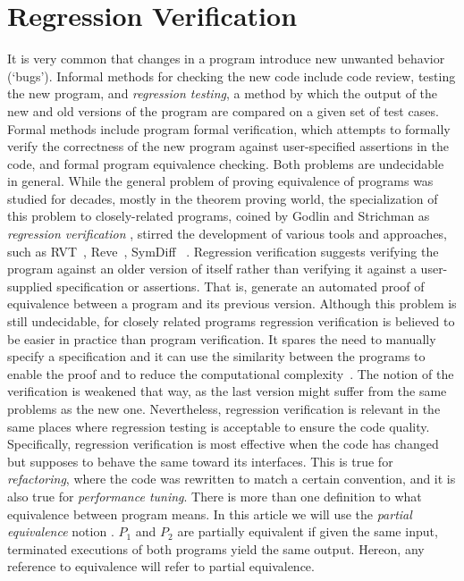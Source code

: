 
\section{Regression Verification}
It is very common that changes in a program introduce new unwanted behavior (`bugs'). Informal methods for checking the new code include code review, testing the new program, and \emph{regression testing}, a method by which the output of the new and old versions of the program are compared on a given set of test cases. Formal methods include program formal verification, which attempts to formally verify the correctness of the new program against user-specified assertions in the code, and formal program equivalence checking. Both problems are undecidable in general. While the general problem of proving equivalence of programs was studied for decades, mostly in the theorem proving world, the specialization of this problem to closely-related programs, coined by  
Godlin and Strichman as \emph{regression verification} \cite{DBLP:conf/dac/GodlinS09}, stirred the development of various tools and approaches, such as RVT~\cite{DBLP:conf/dac/GodlinS09}, Reve~\cite{DBLP:conf/kbse/FelsingGKRU14}, SymDiff~\cite{DBLP:conf/cav/LahiriHKR12} . Regression verification suggests verifying the program against an older version of itself rather than verifying it against a user-supplied specification or assertions. That is, generate an automated proof of equivalence between a program and its previous version. Although this problem is still undecidable, for closely related programs regression verification is believed to be easier in practice than program verification. It spares the need to manually specify a specification and it can use the similarity between the programs to enable the proof  and to reduce the computational complexity~\cite{DBLP:conf/dac/GodlinS09}. The notion of the verification is weakened that way, as the last version might suffer from the same problems as the new one. Nevertheless, regression verification is relevant in the same places where regression testing is acceptable to ensure the code quality. Specifically, regression verification is most effective when the code has changed but supposes to behave the same toward its interfaces. This is true for \emph{refactoring}, where the code was rewritten to match a certain convention, and it is also true for \emph{performance tuning}. There is more than one definition to what equivalence between program means. In this article we will use the \emph{partial equivalence} notion \cite{DBLP:conf/dac/GodlinS09}. $P_1$ and $P_2$ are partially equivalent if given the same input, terminated executions of both programs yield the same output. Hereon, any reference to equivalence will refer to partial equivalence.

